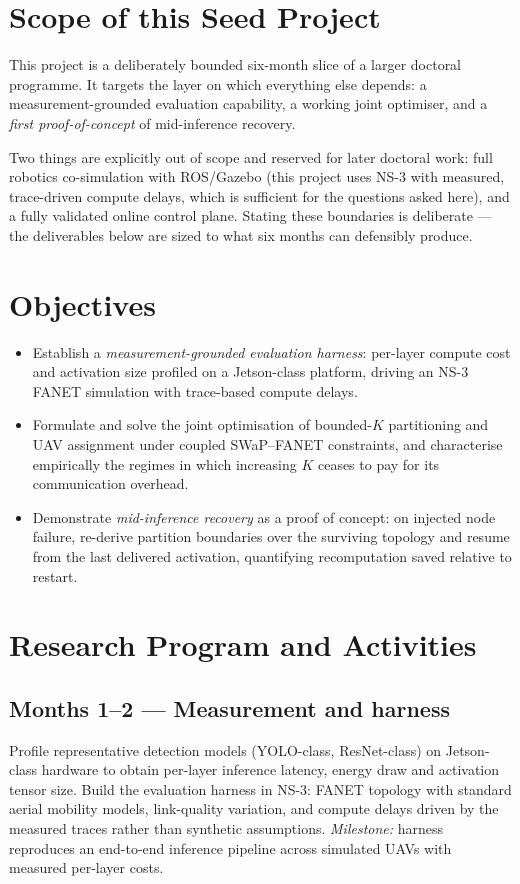 \documentclass[11pt,a4paper]{article}
\begin{document}
\section{Scope of this Seed Project}

This project is a deliberately bounded six-month slice of a larger doctoral programme. It targets the layer on which everything else depends: a measurement-grounded evaluation capability, a working joint optimiser, and a \emph{first proof-of-concept} of mid-inference recovery.

Two things are explicitly out of scope and reserved for later doctoral work: full robotics co-simulation with ROS/Gazebo (this project uses NS-3 with measured, trace-driven compute delays, which is sufficient for the questions asked here), and a fully validated online control plane. Stating these boundaries is deliberate --- the deliverables below are sized to what six months can defensibly produce.

\section{Objectives}

\begin{itemize}
  \item[\textbf{O1.}] Establish a \emph{measurement-grounded evaluation harness}: per-layer compute cost and activation size profiled on a Jetson-class platform, driving an NS-3 FANET simulation with trace-based compute delays.
  \item[\textbf{O2.}] Formulate and solve the joint optimisation of bounded-$K$ partitioning and UAV assignment under coupled SWaP--FANET constraints, and characterise empirically the regimes in which increasing $K$ ceases to pay for its communication overhead.
  \item[\textbf{O3.}] Demonstrate \emph{mid-inference recovery} as a proof of concept: on injected node failure, re-derive partition boundaries over the surviving topology and resume from the last delivered activation, quantifying recomputation saved relative to restart.
\end{itemize}

\section{Research Program and Activities}

\subsection{Months 1--2 --- Measurement and harness}
Profile representative detection models (YOLO-class, ResNet-class) on Jetson-class hardware to obtain per-layer inference latency, energy draw and activation tensor size. Build the evaluation harness in NS-3: FANET topology with standard aerial mobility models, link-quality variation, and compute delays driven by the measured traces rather than synthetic assumptions. \emph{Milestone:} harness reproduces an end-to-end inference pipeline across simulated UAVs with measured per-layer costs.
\end{document}
